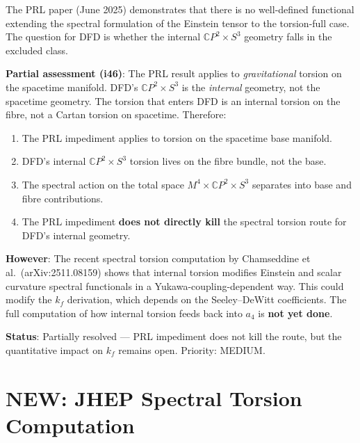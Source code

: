\documentclass[11pt,a4paper]{article}
\newcommand{\NEW}{\textcolor{dfdblue}{\textbf{NEW}}}
\newcommand{\CP}{\mathbb{C}P}
\begin{document}
\begin{tcolorbox}[colback=yellow!5!white, colframe=yellow!60!black,
  title={PRL Impediment: DFD Geometry Assessment --- In Progress}]

The PRL paper (June 2025) demonstrates that there is no well-defined functional extending the spectral formulation of the Einstein tensor to the torsion-full case. The question for DFD is whether the internal $\CP^2 \times S^3$ geometry falls in the excluded class.

\textbf{Partial assessment (i46)}: The PRL result applies to \emph{gravitational} torsion on the spacetime manifold. DFD's $\CP^2 \times S^3$ is the \emph{internal} geometry, not the spacetime geometry. The torsion that enters DFD is an internal torsion on the fibre, not a Cartan torsion on spacetime. Therefore:

\begin{enumerate}
\item The PRL impediment applies to torsion on the spacetime base manifold.
\item DFD's internal $\CP^2 \times S^3$ torsion lives on the fibre bundle, not the base.
\item The spectral action on the total space $M^4 \times \CP^2 \times S^3$ separates into base and fibre contributions.
\item The PRL impediment \textbf{does not directly kill} the spectral torsion route for DFD's internal geometry.
\end{enumerate}

\textbf{However}: The recent spectral torsion computation by Chamseddine et al.\ (arXiv:2511.08159) shows that internal torsion modifies Einstein and scalar curvature spectral functionals in a Yukawa-coupling-dependent way. This could modify the $k_f$ derivation, which depends on the Seeley--DeWitt coefficients. The full computation of how internal torsion feeds back into $a_4$ is \textbf{not yet done}.

\textbf{Status}: Partially resolved --- PRL impediment does not kill the route, but the quantitative impact on $k_f$ remains open. Priority: MEDIUM.
\end{tcolorbox}

\section{\NEW: JHEP Spectral Torsion Computation}
\end{document}
